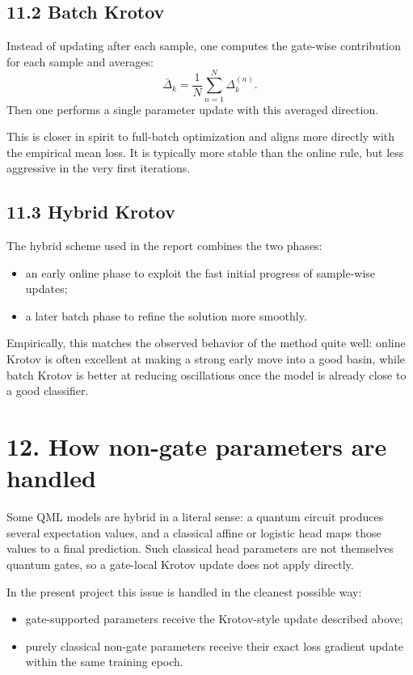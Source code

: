 \documentclass[11pt]{article}
\begin{document}
\subsection*{11.2 Batch Krotov}
Instead of updating after each sample, one computes the gate-wise contribution for each sample and averages:
\begin{equation}
\bar{\Delta}_k
=
\frac{1}{N}\sum_{n=1}^N \Delta_k^{(n)}.
\end{equation}
Then one performs a single parameter update with this averaged direction.

This is closer in spirit to full-batch optimization and aligns more directly with the empirical mean loss. It is typically more stable than the online rule, but less aggressive in the very first iterations.

\subsection*{11.3 Hybrid Krotov}
The hybrid scheme used in the report combines the two phases:
\begin{itemize}
\item an early online phase to exploit the fast initial progress of sample-wise updates;
\item a later batch phase to refine the solution more smoothly.
\end{itemize}

Empirically, this matches the observed behavior of the method quite well: online Krotov is often excellent at making a strong early move into a good basin, while batch Krotov is better at reducing oscillations once the model is already close to a good classifier.

\section*{12. How non-gate parameters are handled}
Some QML models are hybrid in a literal sense: a quantum circuit produces several expectation values, and a classical affine or logistic head maps those values to a final prediction. Such classical head parameters are not themselves quantum gates, so a gate-local Krotov update does not apply directly.

In the present project this issue is handled in the cleanest possible way:
\begin{itemize}
\item gate-supported parameters receive the Krotov-style update described above;
\item purely classical non-gate parameters receive their exact loss gradient update within the same training epoch.
\end{itemize}
\end{document}
